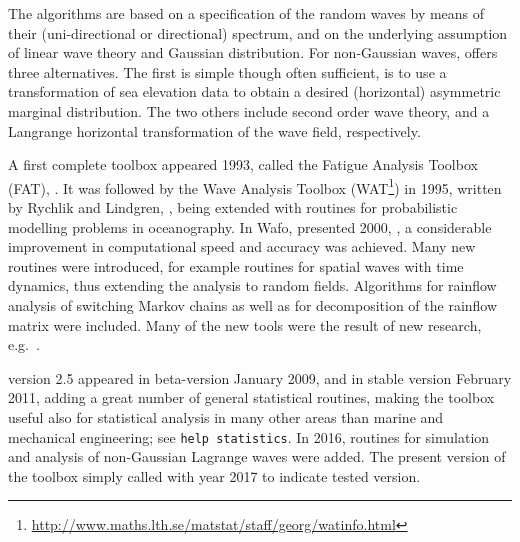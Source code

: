 The algorithms are based on a specification of the random waves by
means of their (uni-directional or directional) spectrum, and on the
underlying assumption of linear wave theory and Gaussian
distribution. For non-Gaussian waves, \wf{} offers three alternatives. 
The first is simple though often sufficient, is to use a transformation 
of sea elevation data to obtain a 
desired (horizontal) asymmetric marginal distribution. 
The two others include second order wave theory, and a Langrange 
horizontal transformation of the wave field, respectively. 

A first complete toolbox appeared
1993, called the Fatigue Analysis Toolbox (FAT),
\cite{FrendahlEtal1993Fatigue}.
It was followed by the
Wave Analysis Toolbox
(WAT\footnote{\url{http://www.maths.lth.se/matstat/staff/georg/watinfo.html}
}) in 1995, written by Rychlik and Lindgren,
\cite{RychlikAndLindgren1995Wave},
being extended with routines for probabilistic modelling problems in
oceanography. In {\sc Wafo}, presented 2000, \cite{BrodtkorbEtal2000Wafo}, 
a considerable improvement in computational speed and accuracy was achieved. 
Many new routines were introduced, for example routines for spatial waves 
with time dynamics, thus extending the analysis to random fields. Algorithms for
rainflow analysis of switching Markov chains as well as 
for decomposition of the rainflow matrix were included.
 Many of the new tools were the result of new research, e.g.\
\cite{RychlikEtal1997Modelling,PodgorskiEtal2000How,
PodgorskiEtal2000Exact,Johannesson1999Rainflow,BrodtkorbEtal2001Joint}.

\progname{} version 2.5 appeared in beta-version January 2009,
and in stable version February 2011, adding a great
number of general statistical routines, making the toolbox useful
also for statistical analysis in many other areas than
marine and mechanical engineering; see \verb+help statistics+. 
In 2016, routines for simulation and analysis 
of non-Gaussian Lagrange waves were added. The present version 
of the toolbox  simply called \progname{} with year 2017 to indicate 
tested \ML{} version.

